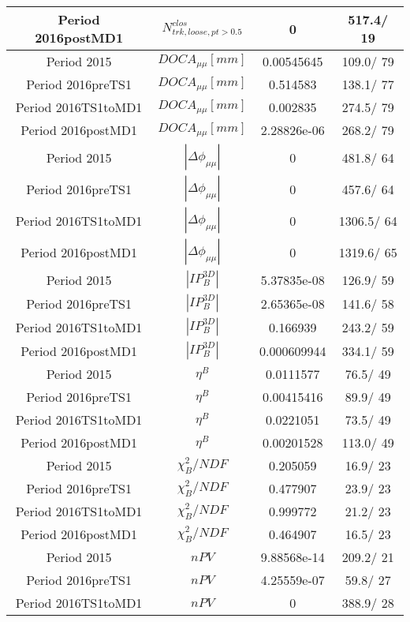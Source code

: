 \documentclass{article}
\begin{document}
\begin{longtable}{c|c|c|c}
\hline
 Period 2016postMD1 & $N^{clos}_{trk, loose, pt>0.5}$ & 0 & 517.4/ 19\\
\hline
 Period 2015 & $DOCA_{\mu\mu} [mm]$ & 0.00545645 & 109.0/ 79\\
\hline
 Period 2016preTS1 & $DOCA_{\mu\mu} [mm]$ & 0.514583 & 138.1/ 77\\
\hline
 Period 2016TS1toMD1 & $DOCA_{\mu\mu} [mm]$ & 0.002835 & 274.5/ 79\\
\hline
 Period 2016postMD1 & $DOCA_{\mu\mu} [mm]$ & 2.28826e-06 & 268.2/ 79\\
\hline
 Period 2015 & $|\Delta\phi_{\mu\mu}|$ & 0 & 481.8/ 64\\
\hline
 Period 2016preTS1 & $|\Delta\phi_{\mu\mu}|$ & 0 & 457.6/ 64\\
\hline
 Period 2016TS1toMD1 & $|\Delta\phi_{\mu\mu}|$ & 0 & 1306.5/ 64\\
\hline
 Period 2016postMD1 & $|\Delta\phi_{\mu\mu}|$ & 0 & 1319.6/ 65\\
\hline
 Period 2015 & $|IP_{B}^{3D}|$ & 5.37835e-08 & 126.9/ 59\\
\hline
 Period 2016preTS1 & $|IP_{B}^{3D}|$ & 2.65365e-08 & 141.6/ 58\\
\hline
 Period 2016TS1toMD1 & $|IP_{B}^{3D}|$ & 0.166939 & 243.2/ 59\\
\hline
 Period 2016postMD1 & $|IP_{B}^{3D}|$ & 0.000609944 & 334.1/ 59\\
\hline
 Period 2015 & $\eta^{B}$ & 0.0111577 &  76.5/ 49\\
\hline
 Period 2016preTS1 & $\eta^{B}$ & 0.00415416 &  89.9/ 49\\
\hline
 Period 2016TS1toMD1 & $\eta^{B}$ & 0.0221051 &  73.5/ 49\\
\hline
 Period 2016postMD1 & $\eta^{B}$ & 0.00201528 & 113.0/ 49\\
\hline
 Period 2015 & $\chi^{2}_{B}/NDF$ & 0.205059 &  16.9/ 23\\
\hline
 Period 2016preTS1 & $\chi^{2}_{B}/NDF$ & 0.477907 &  23.9/ 23\\
\hline
 Period 2016TS1toMD1 & $\chi^{2}_{B}/NDF$ & 0.999772 &  21.2/ 23\\
\hline
 Period 2016postMD1 & $\chi^{2}_{B}/NDF$ & 0.464907 &  16.5/ 23\\
\hline
 Period 2015 & $nPV$ & 9.88568e-14 & 209.2/ 21\\
\hline
 Period 2016preTS1 & $nPV$ & 4.25559e-07 &  59.8/ 27\\
\hline
 Period 2016TS1toMD1 & $nPV$ & 0 & 388.9/ 28\\

\end{longtable}
\end{document}
